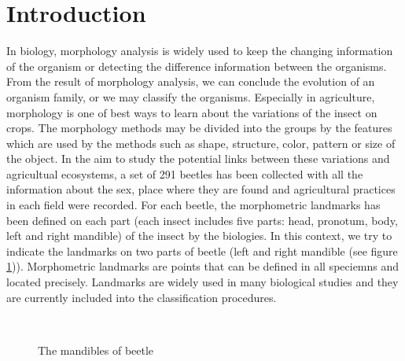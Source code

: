 \documentclass[twoside,twocolumn,10pt]{article}
\begin{document}
\section{Introduction}

\copyrightspace

In biology, morphology analysis is widely used to keep the changing information of the organism or detecting the difference information between the organisms. From the result of morphology analysis, we can conclude the evolution of an organism family, or we may classify the organisms. Especially in agriculture, morphology is one of best ways to learn about the variations of the insect on crops. The morphology methods may be divided into the groups by the features which are used by the methods such as shape, structure, color, pattern or size of the object. In the aim to study the potential links between these variations and agricultual ecosystems, a set of 291 beetles has been collected with all the information about the sex, place where they are found and agricultural practices in each field were recorded. For each beetle, the morphometric landmarks has been defined on each part (each insect includes five parts: head, pronotum, body, left and right mandible) of the insect by the biologies. In this context, we try to indicate the landmarks on two parts of beetle (left and right mandible (see figure \ref{figparts})). Morphometric landmarks are points that can be defined in all speciemns and located precisely. Landmarks are widely used in many biological studies and they are currently included into the classification procedures.\\[0.2cm]
\begin{figure}[h]
\centering
{}~~
\caption{The mandibles of beetle}
\label{figparts}
\end{figure}~\\[0.2cm]
\end{document}
